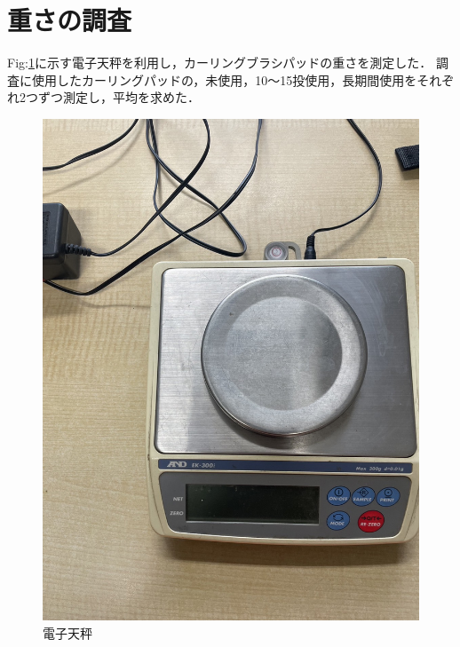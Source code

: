 \documentclass[main]{subfiles}
\begin{document}
\section{重さの調査}
Fig:\ref{fig:aiueo}に示す電子天秤を利用し，カーリングブラシパッドの重さを測定した．
調査に使用したカーリングパッドの，未使用，10～15投使用，長期間使用をそれぞれ2つずつ測定し，平均を求めた．
\begin{figure}[htbp]
    \centering
    \includegraphics[width=0.5\linewidth, height=0.6\linewidth]{figures/denshitenbinn.jpg}
    \caption{電子天秤}
    \label{fig:aiueo}
\end{figure}
\end{document}
